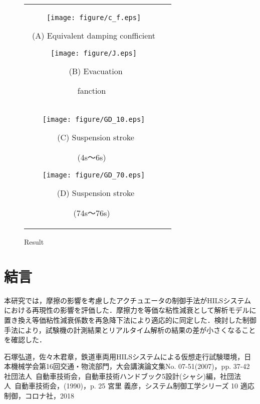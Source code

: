\documentclass{article_vdlab_sotsuron_youshi}
\begin{document}
  \begin{figure}[h]
      \begin{tabular}{cc}
        \begin{minipage}{0.5\hsize}
          \centering
          \texttt{[image: figure/c\_f.eps]}
          \begin{center}
            \vspace{-4mm}
            \ (A) Equivalent damping confficient\
          \end{center}
        \end{minipage}
        \begin{minipage}{0.5\hsize}
          \centering
          \texttt{[image: figure/J.eps]}
          \begin{center}
            \vspace{-4mm}
            \ (B)  Evacuation \par fanction\
          \end{center}
        \end{minipage}\\
          \begin{minipage}{0.5\hsize}
            \centering
            \texttt{[image: figure/GD\_10.eps]}
            \begin{center}
              \vspace{-4mm}
              \ (C) Suspension stroke \par (4s～6s)\
            \end{center}
          \end{minipage}
          \begin{minipage}{0.5\hsize}
            \centering
            \texttt{[image: figure/GD\_70.eps]}
            \begin{center}
              \vspace{-4mm}
              \ (D) Suspension stroke \par (74s～76s)\
            \end{center}
          \end{minipage}
        \end{tabular}
        \vspace{-1mm}
      \caption{Result}
      \label{fig:HILS_test}
  \end{figure}

\section{結言}
本研究では，摩擦の影響を考慮したアクチュエータの制御手法がHILSシステムにおける再現性の影響を評価した．摩擦力を等価な粘性減衰として解析モデルに置き換え等価粘性減衰係数を再急降下法により適応的に同定した．検討した制御手法により，試験機の計測結果とリアルタイム解析の結果の差が小さくなることを確認した．

\begin{thebibliography}{9}
  \bibitem{1}石塚弘道，佐々木君章，鉄道車両用HILSシステムによる仮想走行試験環境，日本機械学会第16回交通・物流部門，大会講演論文集No. 07-51(2007)，pp. 37-42
  \bibitem{7}社団法人\ 自動車技術会，自動車技術ハンドブック5設計(シャシ)編，社団法人\ 自動車技術会，(1990)，p. 25
  宮里 義彦，システム制御工学シリーズ 10 適応制御，コロナ社，2018
\end{thebibliography}
\end{document}
